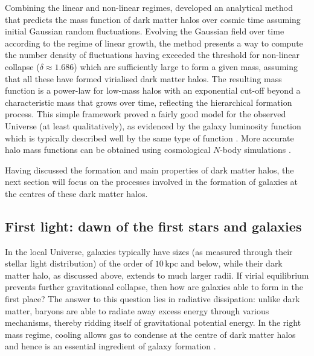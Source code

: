 Combining the linear and non-linear regimes, \citet{1974ApJ...187..425P} developed an analytical method that predicts the mass function of dark matter halos over cosmic time assuming initial Gaussian random fluctuations. Evolving the Gaussian field over time according to the regime of linear growth, the method presents a way to compute the number density of fluctuations having exceeded the threshold for non-linear collapse ($\delta \approx 1.686$) which are sufficiently large to form a given mass, assuming that all these have formed virialised dark matter halos. The resulting mass function is a power-law for low-mass halos with an exponential cut-off beyond a characteristic mass that grows over time, reflecting the hierarchical formation process. This simple framework proved a fairly good model for the observed Universe (at least qualitatively), as evidenced by the galaxy luminosity function which is typically described well by the same type of function \citep[][]{1976ApJ...203..297S}. More accurate halo mass functions can be obtained using cosmological $N$-body simulations \citep[e.g.][]{2008ApJ...688..709T}.

Having discussed the formation and main properties of dark matter halos, the next section will focus on the processes involved in the formation of galaxies at the centres of these dark matter halos.

\subsection{First light: dawn of the first stars and galaxies}
\label{chIssec:Galaxy_formation}

In the local Universe, galaxies typically have sizes (as measured through their stellar light distribution) of the order of $10 \, \mathrm{kpc}$ and below, while their dark matter halo, as discussed above, extends to much larger radii. If virial equilibrium prevents further gravitational collapse, then how are galaxies able to form in the first place? The answer to this question lies in radiative dissipation: unlike dark matter, baryons are able to radiate away excess energy through various mechanisms, thereby ridding itself of gravitational potential energy. In the right mass regime, cooling allows gas to condense at the centre of dark matter halos and hence is an essential ingredient of galaxy formation \citep{1977ApJ...211..638S, 1977MNRAS.179..541R, 1977ApJ...215..483B, 1978MNRAS.183..341W}.

